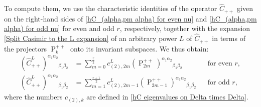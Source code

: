 \documentclass[a4paper]{article}
\newcommand{\hC}{\widehat{C}}
\renewcommand{\=}{\ =\ }
\DeclareMathOperator{\proj}{P}
\numberwithin{equation}{section}
\theoremstyle{remark}
\begin{document}
To compute them, we use the characteristic identities of the operator $\hC_{++}$ given on the right-hand sides of \eqref{hC_(alpha,pm alpha) for even nu} and \eqref{hC_(alpha,pm alpha) for odd nu} for even and odd $r$, respectively, together with the expansion \eqref{Split Casimir to the L expansion} of an arbitrary power $L$ of $\hC_{++}$ in terms of the projectors $\proj_{k}^{++}$ onto its invariant subspaces. We thus obtain:
\begin{align}
(\hC_{++}^L)^{\alpha_1\alpha_2}{}_{\beta_1\beta_2}
&=\sum_{m=0}^{\frac{r}{2}} c_{(2),2m}^L (\proj^{++}_{2m})^{\alpha_1\alpha_2}{}_{\beta_1\beta_2}
&& \text{for even } r,\\
(\hC_{++}^L)^{\alpha_1\alpha_2}{}_{\beta_1\beta_2}
&=\sum_{m=1}^{\frac{r+1}{2}} c_{(2),2m-1}^L (\proj^{++}_{2m-1})^{\alpha_1\alpha_2}{}_{\beta_1\beta_2}
&& \text{for odd } r,
\end{align}
where the numbers $c_{(2),k}$ are defined in \eqref{hC eigenvalues on Delta times Delta}.
\end{document}
